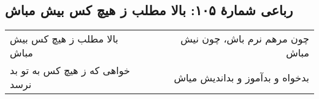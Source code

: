 \begin{center}
\section*{رباعی شمارهٔ ۱۰۵:  بالا مطلب ز هیچ کس  بیش مباش}
\label{sec:105}
\begin{longtable}{l p{0.5cm} r}
 بالا مطلب ز هیچ کس  بیش مباش
&&
چون مرهم نرم باش، چون نیش مباش
\\
خواهی که ز هیچ کس به تو بد نرسد
&&
بدخواه و بدآموز و بداندیش میاش
\\
\end{longtable}
\end{center}
